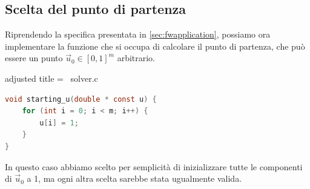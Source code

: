 \subsection{Scelta del punto di partenza}
Riprendendo la specifica presentata in \ref{sec:fwapplication}, possiamo ora implementare la funzione che si occupa di
calcolare il punto di partenza, che può essere un punto \( \vec{u}_0 \in [0, 1]^m \) arbitrario.

\begin{code}{adjusted title = {\cicon\ solver.c}}
\begin{lstlisting}[language=c, style = style, caption={Calcolo del punto di partenza.}]
void starting_u(double * const u) {
    for (int i = 0; i < m; i++) {
        u[i] = 1;
    }
}
\end{lstlisting}
\end{code}
\noindent
In questo caso abbiamo scelto per semplicità di inizializzare tutte le componenti di \( \vec{u}_0 \) a 1, ma ogni altra
scelta sarebbe stata ugualmente valida.

